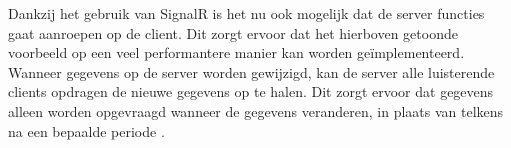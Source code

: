 Dankzij het gebruik van SignalR is het nu ook mogelijk dat de server functies gaat aanroepen op de client. Dit zorgt ervoor dat het hierboven getoonde voorbeeld op een veel performantere manier kan worden geïmplementeerd. Wanneer gegevens op de server worden gewijzigd, kan de server alle luisterende clients opdragen de nieuwe gegevens op te halen. Dit zorgt ervoor dat gegevens alleen worden opgevraagd wanneer de gegevens veranderen, in plaats van telkens na een bepaalde periode \autocite{BradyGaster2020}.